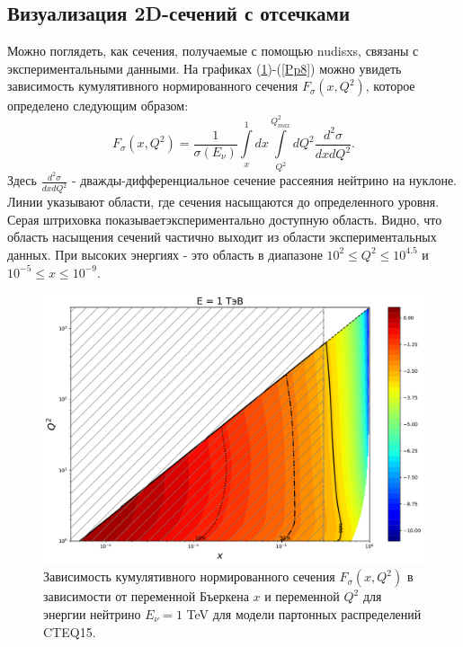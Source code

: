 \subsection{Визуализация 2D-сечений с отсечками}
Можно поглядеть, как сечения, получаемые с помощью nudisxs, связаны с экспериментальными данными. На графиках (\ref{Pp3})-(\ref{Pp8}) можно увидеть зависимость кумулятивного нормированного сечения $F_{\sigma}(x,Q^2)$, которое определено следующим образом: 
 \begin{equation}
     F_{\sigma}(x,Q^2) = \frac{1}{\sigma(E_{\nu})}\int\limits_{x}^1dx\int\limits_{Q^2}^{Q^2_{max}}dQ^2\frac{d^2\sigma}{dxdQ^2}.
 \end{equation}
 Здесь $\frac{d^2\sigma}{dxdQ^2}$ - дважды-дифференциальное сечение рассеяния нейтрино на нуклоне. Линии указывают области, где сечения насыщаются до определенного уровня. Серая штриховка показываетэкспериментально доступную область. Видно, что область насыщения сечений частично выходит из области экспериментальных данных. При высоких энергиях  - это область в диапазоне $10^2\le Q^2\le10^{4.5} $ и $10^{-5}\le x \le 10^{-9}$.  
 \begin{figure}[!h]
\centering
\includegraphics[width=0.97\linewidth]{"images/NuProp/cdfxq2_cc_proton_CT18ZNNLO_14_1000.pdf"}
\caption{Зависимость кумулятивного нормированного сечения $F_{\sigma}(x,Q^2)$ в зависимости от переменной Бъеркена $x$ и переменной $Q^2$ для энергии нейтрино $E_{\nu} = 1$ TeV для модели партонных распределений CTEQ15\cite{ncteq15}. }
\label{Pp3}
\end{figure}
